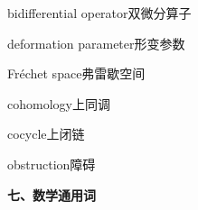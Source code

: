 \begin{multicols}{2}
bidifferential operator\hspace{0.9em}双微分算子\par
deformation parameter\hspace{0.9em}形变参数\par
Fréchet space\hspace{0.9em}弗雷歇空间\par
cohomology\hspace{0.9em}上同调\par
cocycle\hspace{0.9em}上闭链\par
obstruction\hspace{0.9em}障碍\par
\end{multicols}

\filbreak
\vspace{0.9em}
\noindent\textbf{七、数学通用词}\par\nobreak\vspace{0.35em}
